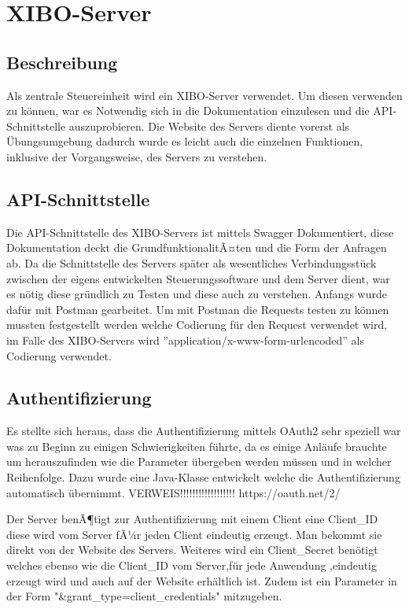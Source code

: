 \chapter{XIBO-Server}
\section{Beschreibung}
Als zentrale Steuereinheit wird ein XIBO-Server verwendet. Um diesen verwenden zu können, war es Notwendig sich in die Dokumentation einzulesen und die API-Schnittstelle auszuprobieren. Die Website des Servers diente vorerst als Übungsumgebung dadurch wurde es leicht auch die einzelnen Funktionen, inklusive der Vorgangsweise, des Servers zu verstehen.

\section{API-Schnittstelle}
Die API-Schnittstelle des XIBO-Servers ist mittels Swagger Dokumentiert, diese Dokumentation deckt die GrundfunktionalitÃ¤ten und die Form der Anfragen ab. Da die Schnittstelle des Servers später als wesentliches Verbindungsstück zwischen der eigens entwickelten Steuerungssoftware und dem Server dient, war es nötig diese gründlich zu Testen und diese auch zu verstehen. Anfangs wurde dafür mit Postman gearbeitet. Um mit Postman die Requests testen zu können mussten festgestellt werden welche Codierung für den Request verwendet wird, im Falle des XIBO-Servers wird ''application/x-www-form-urlencoded'' als Codierung verwendet.


\section{Authentifizierung}
Es stellte sich heraus, dass die Authentifizierung mittels OAuth2 sehr speziell war was zu Beginn zu einigen Schwierigkeiten führte, da es einige Anläufe brauchte um herauszufinden wie die Parameter übergeben werden müssen und in welcher Reihenfolge. Dazu wurde eine Java-Klasse entwickelt welche die Authentifizierung automatisch übernimmt.
VERWEIS!!!!!!!!!!!!!!!!!!
https://oauth.net/2/

Der Server benÃ¶tigt zur Authentifizierung mit einem Client eine Client_ID diese wird vom Server fÃ¼r jeden Client eindeutig erzeugt. Man bekommt sie direkt von der Website des Servers. 
Weiteres wird ein Client_Secret benötigt welches ebenso wie die Client_ID vom Server,für jede Anwendung ,eindeutig erzeugt wird und auch auf der Website erhältlich ist. Zudem ist ein Parameter in der Form "&grant_type=client_credentials" mitzugeben.

